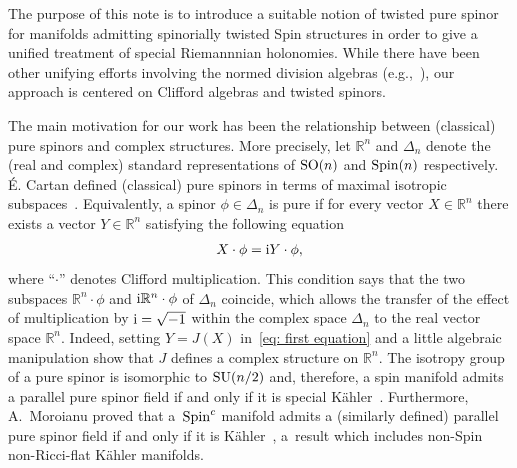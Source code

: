 \documentclass[10pt,a4paper]{amsart}
\numberwithin{equation}{section}
\begin{document}
The purpose of this note is to introduce a suitable notion of twisted pure spinor for manifolds admitting
spinorially twisted Spin structures \cite{Espinosa-Herrera} in order to give a unified
treatment of special Riemannnian holonomies.
While there have been other unifying efforts involving the normed division algebras
(e.g.,~\cite{Leung}),
our approach is centered on Clifford algebras and twisted spinors.


The main motivation for our work has been the relationship between (classical) pure spinors and complex structures. More precisely,
let $\mathbb{R}^n$ and $\Delta_n$ denote the (real and complex) standard representations of ${\rm SO}(n)$ and ${\rm Spin}(n)$ respectively.
\'E. Cartan defined (classical) pure spinors in terms of maximal isotropic subspaces~\cite{Cartan}.
Equivalently, a spinor $\phi\in \Delta_n$ is pure if for every vector $X\in\mathbb{R}^n$ there exists a vector
$Y\in\mathbb{R}^n$ satisfying the following equation~\cite{Lawson}
\begin{gather}
X\cdot\phi = {\rm i}Y\cdot \phi,\label{eq: first equation}
\end{gather}
where ``$\cdot$'' denotes Clifford multiplication.
This condition says that the two subspaces $\mathbb{R}^n\cdot\phi$ and ${\rm i}\mathbb{R}^n\cdot\phi$ of
$\Delta_n$ coincide, which
allows the transfer of the effect of multiplication by ${\rm i}=\sqrt{-1}$ within the complex space
$\Delta_n$ to the real vector space $\mathbb{R}^n$.
Indeed, setting $Y=J(X)$ in~\eqref{eq: first equation} and a little algebraic manipulation show that $J$
defines a complex structure on $\mathbb{R}^n$. The isotropy group of a pure spinor is isomorphic to ${\rm SU}(n/2)$ and,
therefore, a spin manifold admits a parallel pure spinor field if and only if it is special K\"ahler~\cite{Lawson}.
Furthermore, A.~Moroianu proved that a~${\rm Spin}^c$ manifold admits a (similarly defined) parallel pure spinor field if
and only if it is K\"ahler~\cite{Moroianu}, a~result which includes non-Spin non-Ricci-flat K\"ahler manifolds.
\end{document}
